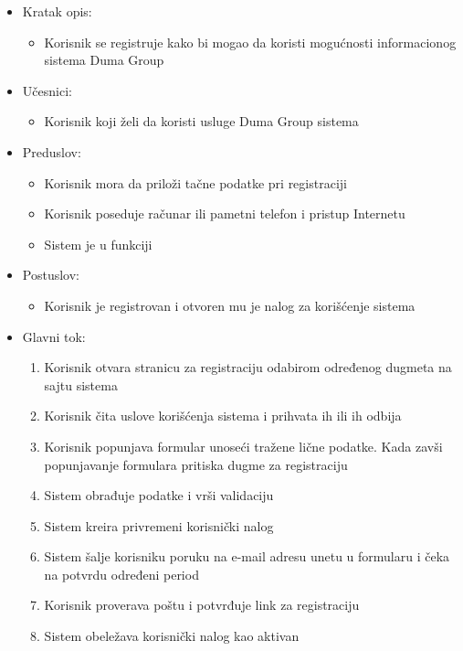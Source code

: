 \documentclass[a4paper]{article}
\begin{document}
\begin{itemize}
    \item Kratak opis:
        \begin{itemize}
            \item Korisnik se registruje kako bi mogao da koristi mogućnosti informacionog sistema Duma Group
        \end{itemize}
    \item Učesnici:
        \begin{itemize}
            \item Korisnik koji želi da koristi usluge Duma Group sistema
        \end{itemize}
    \item Preduslov:
        \begin{itemize}
            \item Korisnik mora da priloži tačne podatke pri registraciji
            \item Korisnik poseduje računar ili pametni telefon i pristup Internetu
            \item Sistem je u funkciji
        \end{itemize}
    \item Postuslov:
        \begin{itemize}
            \item Korisnik je registrovan i otvoren mu je nalog za korišćenje sistema
        \end{itemize}
    \item Glavni tok:
        \begin{enumerate}
            \item  Korisnik otvara stranicu za registraciju odabirom određenog dugmeta na sajtu sistema
            \item Korisnik čita uslove korišćenja sistema i prihvata ih ili ih odbija 
            \item Korisnik popunjava formular unoseći tražene lične podatke. Kada zavši popunjavanje formulara pritiska dugme za registraciju
            \item Sistem obrađuje podatke i vrši validaciju
            \item Sistem kreira privremeni korisnički nalog
            \item Sistem šalje korisniku poruku na e-mail adresu unetu u formularu i čeka na potvrdu određeni period
            \item Korisnik proverava poštu i potvrđuje link za registraciju
            \item Sistem obeležava korisnički nalog kao aktivan

\end{enumerate}
\end{itemize}
\end{document}
